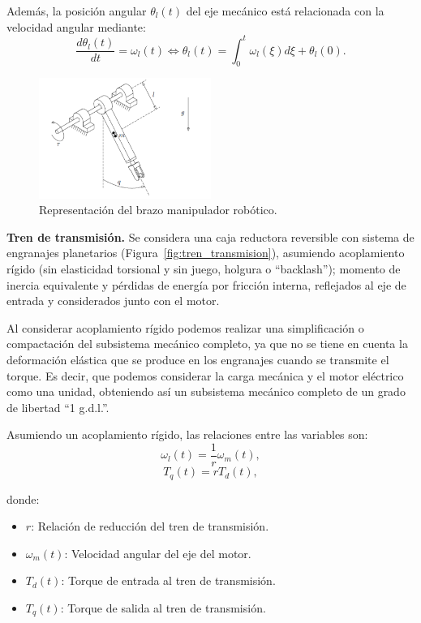 \documentclass{article}
\begin{document}
Además, la posición angular \( \theta_l(t) \) del eje mecánico está relacionada con la velocidad angular mediante:
\begin{equation}
    \frac{d\theta_l(t)}{dt} = \omega_l(t) \iff \theta_l(t) = \int_{0}^{t} \omega_l(\xi) d\xi + \theta_l(0).
\end{equation}

\begin{figure}[H]
    \centering
    \includegraphics[width=0.5\textwidth]{Imagenes/brazo_robotico.png}
    \caption{Representación del brazo manipulador robótico.}
    \label{fig:brazo_robotico}
\end{figure}


\textbf{Tren de transmisión.}
Se considera una caja reductora reversible con sistema de engranajes planetarios (Figura~\ref{fig:tren_transmision}), asumiendo acoplamiento rígido
(sin elasticidad torsional y sin juego, holgura o “backlash”); momento de inercia equivalente y pérdidas de energía por fricción
interna, reflejados al eje de entrada y considerados junto con el motor.

Al considerar acoplamiento rígido podemos realizar una simplificación o compactación del subsistema mecánico completo,
ya que no se tiene en cuenta la deformación elástica que se produce en los engranajes cuando se transmite el torque. Es decir,
que podemos considerar la carga mecánica y el motor eléctrico como una unidad, obteniendo así un subsistema mecánico
completo de un grado de libertad “1 g.d.l.”.

Asumiendo un acoplamiento rígido, las relaciones entre las variables son:
\begin{equation}
\label{eq:transmision_velocidades}
    \omega_l(t) = \frac{1}{r} \omega_m(t),
\end{equation}
\begin{equation}
\label{eq:transmision_torques}
    T_q(t) = r T_d(t),
\end{equation}

donde:
\begin{itemize}
    \item \( r \): Relación de reducción del tren de transmisión.
    \item \( \omega_m(t) \): Velocidad angular del eje del motor.
    \item \( T_d(t) \): Torque de entrada al tren de transmisión.
    \item \( T_q(t) \): Torque de salida al tren de transmisión.
\end{itemize}
\end{document}
